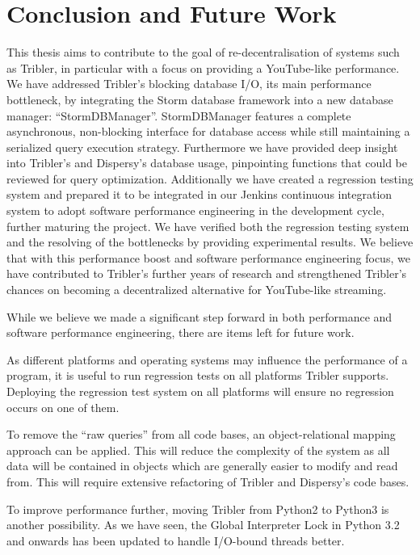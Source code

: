 \chapter{Conclusion and Future Work}
\label{cpt:conclusion_and_future_work}

This thesis aims to contribute to the goal of re-decentralisation of systems such as Tribler, in particular with a focus on providing a YouTube-like performance.
We have addressed Tribler's blocking database I/O, its main performance bottleneck, by integrating the Storm database framework into a new database manager: \enquote{StormDBManager}.
StormDBManager features a complete asynchronous, non-blocking interface for database access while still maintaining a serialized query execution strategy.
Furthermore we have provided deep insight into Tribler's and Dispersy's database usage, pinpointing functions that could be reviewed for query optimization.
Additionally we have created a regression testing system and prepared it to be integrated in our Jenkins continuous integration system to adopt software performance engineering in the development cycle, further maturing the project.
We have verified both the regression testing system and the resolving of the bottlenecks by providing experimental results.
We believe that with this performance boost and software performance engineering focus, we have contributed to Tribler's further years of research and strengthened Tribler's chances on becoming a decentralized alternative for YouTube-like streaming.

While we believe we made a significant step forward in both performance and software performance engineering, there are items left for future work.

As different platforms and operating systems may influence the performance of a program, it is useful to run regression tests on all platforms Tribler supports.
Deploying the regression test system on all platforms will ensure no regression occurs on one of them.

To remove the \enquote{raw queries} from all code bases, an object-relational mapping approach can be applied.
This will reduce the complexity of the system as all data will be contained in objects which are generally easier to modify and read from.
This will require extensive refactoring of Tribler and Dispersy's code bases.

To improve performance further, moving Tribler from Python2 to Python3 is another possibility.
As we have seen, the Global Interpreter Lock in Python 3.2 and onwards has been updated to handle I/O-bound threads better.

